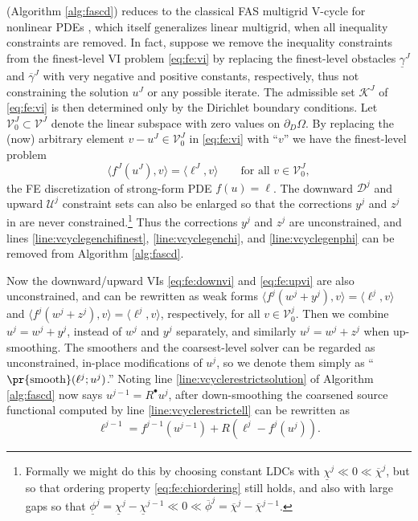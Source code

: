 \documentclass[letterpaper,final,12pt,reqno]{amsart}
\theoremstyle{cstyle}
\theoremstyle{cstyle*}
\theoremstyle{dstyle}
\numberwithin{equation}{section}
\numberwithin{figure}{section}
\numberwithin{table}{section}
\numberwithin{theorem}{section}
\newcommand{\ip}[2]{\langle#1,#2\rangle}
\newcommand{\iR}{R^{\bullet}}
\begin{document}
 (Algorithm \ref{alg:fascd}) reduces to the classical FAS multigrid V-cycle for nonlinear PDEs \cite{Trottenbergetal2001}, which itself generalizes linear multigrid, when all inequality constraints are removed.  In fact, suppose we remove the inequality constraints from the finest-level VI problem \eqref{eq:fe:vi} by replacing the finest-level obstacles $\underline{\gamma}^J$ and $\overline{\gamma}^J$ with very negative and positive constants, respectively, thus not constraining the solution $u^J$ or any possible iterate.  The admissible set $\mathcal{K}^J$ of \eqref{eq:fe:vi} is then determined only by the Dirichlet boundary conditions.  Let $\mathcal{V}_0^J \subset \mathcal{V}^J$ denote the linear subspace with zero values on $\partial_D\Omega$.  By replacing the (now) arbitrary element $v-u^J\in\mathcal{V}_0^J$ in \eqref{eq:fe:vi} with ``$v$'' we have the finest-level problem
\begin{equation}
\ip{f^J(u^J)}{v} = \ip{\ell^J}{v} \qquad \text{for all } v\in \mathcal{V}_0^J, \label{eq:app:fas:pde}
\end{equation}
the FE discretization of strong-form PDE $f(u)=\ell$.  The downward $\mathcal{D}^j$ and upward $\mathcal{U}^j$ constraint sets can also be enlarged so that the corrections $y^j$ and $z^j$ in  are never constrained.\footnote{Formally we might do this by choosing constant LDCs with $\underline{\chi}^j \ll 0 \ll \overline{\chi}^j$, but so that ordering property \eqref{eq:fe:chiordering} still holds, and also with large gaps so that $\underline{\phi}^j = \underline{\chi}^j - \underline{\chi}^{j-1} \ll 0 \ll \overline{\phi}^j = \overline{\chi}^j - \overline{\chi}^{j-1}$.}  Thus the corrections $y^j$ and $z^j$ are unconstrained, and lines \ref{line:vcyclegenchifinest}, \ref{line:vcyclegenchi}, and \ref{line:vcyclegenphi} can be removed from Algorithm \ref{alg:fascd}.

Now the downward/upward VIs \eqref{eq:fe:downvi} and \eqref{eq:fe:upvi} are also unconstrained, and can be rewritten as weak forms $\ip{f^j(w^j + y^j)}{v} = \ip{\ell^j}{v}$ and $\ip{f^j(w^j + z^j)}{v} = \ip{\ell^j}{v}$, respectively, for all $v\in \mathcal{V}_0^j$.  Then we combine $u^j=w^j+y^j$, instead of $w^j$ and $y^j$ separately, and similarly $u^j=w^j+z^j$ when up-smoothing.  The smoothers and the coarsest-level solver can be regarded as unconstrained, in-place modifications of $u^j$, so we denote them simply as ``$\text{\pr{smooth}}(\ell^j;u^j)$.''  Noting line \ref{line:vcyclerestrictsolution} of Algorithm \ref{alg:fascd} now says $u^{j-1}=\iR u^j$, after down-smoothing the coarsened source functional computed by line \ref{line:vcyclerestrictell} can be rewritten as
\begin{equation}
\ell^{j-1} = f^{j-1}\left(u^{j-1}\right) + R\left(\ell^j-f^j(u^j)\right). \label{eq:app:fas:levelsource}
\end{equation}
\end{document}
